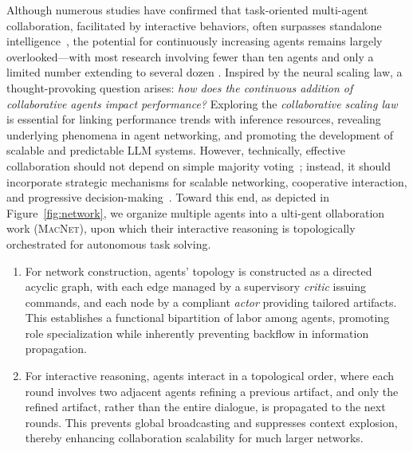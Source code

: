 \documentclass{article}
\begin{document}
Although numerous studies have confirmed that task-oriented multi-agent collaboration, facilitated by interactive behaviors, often surpasses standalone intelligence~\citep{chen2023agentverse,Chen2024ReConcile}, the potential for continuously increasing agents remains largely overlooked—with most research involving fewer than ten agents and only a limited number extending to several dozen \citep{li2023camel,park2023generative,Zhang2024Controlling}.
Inspired by the neural scaling law, a thought-provoking question arises: \textit{how does the continuous addition of collaborative agents impact performance?}
Exploring the \textit{collaborative scaling law} is essential for linking performance trends with inference resources, revealing underlying phenomena in agent networking, and promoting the development of scalable and predictable LLM systems.
However, technically, effective collaboration should not depend on simple majority voting~\citep{Brown2024Large,chen2024are}; instead, it should incorporate strategic mechanisms for scalable networking, cooperative interaction, and progressive decision-making~\citep{Hopfield1982Neural,Almaatouq2021Task,Du2024Improving}.
Toward this end, as depicted in Figure~\ref{fig:network}, we organize multiple agents into a ulti-gent ollaboration work (\textsc{MacNet}), upon which their interactive reasoning is topologically orchestrated for autonomous task solving.
\begin{enumerate}[$\bullet$]
\setlength{\itemsep}{2pt}
\setlength{\parsep}{2pt}
\item For network construction, agents' topology is constructed as a directed acyclic graph, with each edge managed by a supervisory \textit{critic} issuing commands, and each node by a compliant \textit{actor} providing tailored artifacts. This establishes a functional bipartition of labor among agents, promoting role specialization while inherently preventing backflow in information propagation.
\item For interactive reasoning, agents interact in a topological order, where each round involves two adjacent agents refining a previous artifact, and only the refined artifact, rather than the entire dialogue, is propagated to the next rounds.
This prevents global broadcasting and suppresses context explosion, thereby enhancing collaboration scalability for much larger networks.
\end{enumerate}
\end{document}

